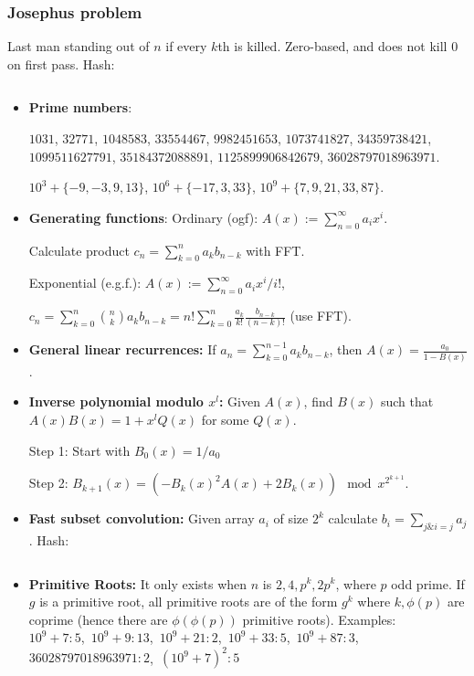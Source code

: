 \documentclass[9pt,a4paper,landscape,oneside]{amsart}
\newcommand{\mintedstyle}[2]{\inputminted{#1}{code/#2}}
\newcommand{\code}[1]{ Hash: 
\mintedstyle{cpp}{#1}}
\newcommand*\BitAnd{\mathrel{\&}}
\newenvironment{myitemize}
{\begin{itemize}[leftmargin=.3cm]
	\setlength{\itemsep}{0pt}
	\setlength{\parskip}{0pt}
	\setlength{\parsep}{0pt}     }
{ \end{itemize}                  }
\begin{document}
\begin{multicols*}{3}
\subsubsection{Josephus problem}
Last man standing out of $n$ if every $k$th is killed. Zero-based, and
does not kill $0$ on first pass.
\code{math/josephus.cpp}

\begin{myitemize}
	\item \textbf{Prime numbers}:

	$1031$, $32771$, $1048583$, $33554467$, $9982451653$, $1073741827$, $34359738421$, $1099511627791$, $35184372088891$, $1125899906842679$, $36028797018963971$.

	$10^3 + \{-9,-3,9,13\}$, $10^6 + \{-17,3,33\}$, $10^9+ \{7,9,21,33,87\}$.

	\item \textbf{Generating functions}:
	Ordinary (ogf): $A(x) := \sum_{n=0}^{\infty} a_i x^i$.

	Calculate product $c_n = \sum_{k=0}^{n} a_k b_{n-k}$ with FFT.

	Exponential (e.g.f.): $A(x) := \sum_{n=0}^{\infty} a_i x^i/i!$,

	$c_n = \sum_{k=0}^{n} \binom{n}{k} a_k b_{n-k} = n! \sum_{k=0}^{n} \frac{a_k}{k!} \frac{b_{n-k}}{(n-k)!}$ (use FFT).

\item \textbf{General linear recurrences:}
	If $a_n = \sum_{k=0}^{n-1} a_k b_{n-k}$, then $A(x) = \frac{a_0}{1-B(x)}$.

\item \textbf{Inverse polynomial modulo $x^l$:}
	Given $A(x)$, find $B(x)$ such that $A(x)B(x) = 1 + x^l Q(x)$ for some $Q(x)$.

	Step 1: Start with $B_0(x) = 1/a_0$

	Step 2: $B_{k+1}(x) = (-B_k(x)^2 A(x) + 2 B_k(x)) \mod x^{2^{k+1}}$.

\item \textbf{Fast subset convolution:}
	Given array $a_i$ of size $2^k$ calculate $b_i = \sum_{j \BitAnd i = j} a_j$.
	\code{math/subset_conv.cpp}

\item \textbf{Primitive Roots:}
	It only exists when $n$ is $2, 4, p^k, 2p^k$, where $p$ odd prime.
	If $g$ is a primitive root, all primitive roots are of the form $g^k$
	where $k,\phi(p)$ are coprime (hence there are $\phi(\phi(p))$ primitive roots). Examples:\\
    $10^9 + 7 : 5$,\ $10^9 + 9 : 13$,\ $10^9 + 21 : 2$,\ $10^9 + 33 : 5$,\ $10^9 + 87 : 3$,\ $36028797018963971 : 2$,\ $(10^9 + 7)^2 : 5$
	

\end{myitemize}
\end{multicols*}
\end{document}

